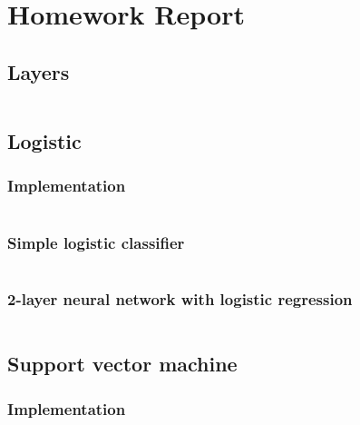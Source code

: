 \documentclass[12pt]{article}
\begin{document}
\section{Homework Report}
\tableofcontents

\newpage
\subsection{Layers}
\begin{scriptsize}
\inputminted[frame=single,framesep=10pt,linenos, breaklines,xleftmargin=\parindent,xrightmargin=\parindent]{python}{./Homework1/code/layers.py}
\end{scriptsize}


\newpage
\subsection{Logistic}
\subsubsection{Implementation}
\begin{scriptsize}
\inputminted[frame=single,framesep=10pt,linenos, breaklines,xleftmargin=\parindent,xrightmargin=\parindent]{python}{./Homework1/code/logistic.py}
\end{scriptsize}

\newpage
\subsubsection{Simple logistic classifier}
\inputminted[frame=single,framesep=10pt,linenos, breaklines,xleftmargin=\parindent,xrightmargin=\parindent]{python}{./Homework1/code/logistic1.out}

\newpage
\subsubsection{2-layer neural network with logistic regression}
\inputminted[frame=single,framesep=10pt,linenos, breaklines,xleftmargin=\parindent,xrightmargin=\parindent]{python}{./Homework1/code/logistic2.out}


\newpage
\subsection{Support vector machine}
\subsubsection{Implementation}
\begin{scriptsize}
\inputminted[frame=single,framesep=10pt,linenos, breaklines,xleftmargin=\parindent,xrightmargin=\parindent]{python}{./Homework1/code/svm.py}
\end{scriptsize}
\end{document}
